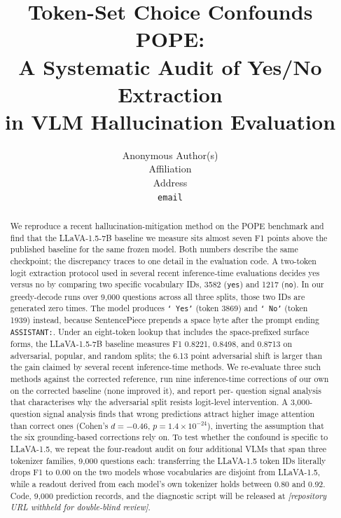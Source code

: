 \documentclass{article}
\title{Token-Set Choice Confounds POPE:\\
A Systematic Audit of Yes/No Extraction\\
in VLM Hallucination Evaluation}
\author{%
  Anonymous Author(s) \\
  Affiliation \\
  Address \\
  \texttt{email}
}
\begin{document}
\maketitle

\begin{abstract}
We reproduce a recent hallucination-mitigation method on the POPE
benchmark and find that the LLaVA-1.5-7B baseline we measure sits
almost seven F1 points above the published baseline for the same
frozen model. Both numbers describe the same checkpoint; the
discrepancy traces to one detail in the evaluation code. A two-token
logit extraction protocol used in several recent inference-time
evaluations decides yes versus no by comparing two specific vocabulary
IDs, 3582 (\texttt{yes}) and 1217 (\texttt{no}). In our greedy-decode
runs over 9{,}000 questions across all three splits, those two IDs are
generated zero times. The model produces \texttt{`\,Yes'} (token 3869)
and \texttt{`\,No'} (token 1939) instead, because SentencePiece
prepends a space byte after the prompt ending \texttt{ASSISTANT:}.
Under an eight-token lookup that includes the space-prefixed surface
forms, the LLaVA-1.5-7B baseline measures F1 0.8221, 0.8498, and
0.8713 on adversarial, popular, and random splits; the 6.13 point
adversarial shift is larger than the gain claimed by several recent
inference-time methods. We re-evaluate three such methods against
the corrected reference, run nine inference-time corrections of our
own on the corrected baseline (none improved it), and report per-
question signal analysis that characterises why the adversarial split
resists logit-level intervention. A 3{,}000-question signal analysis
finds that wrong predictions attract higher image attention than correct
ones (Cohen's $d=-0.46$, $p=1.4\times10^{-24}$), inverting the assumption
that the six grounding-based corrections rely on. To test whether the confound is
specific to LLaVA-1.5, we repeat the four-readout audit on four
additional VLMs that span three tokenizer families, 9{,}000 questions
each: transferring the LLaVA-1.5 token IDs literally drops F1 to 0.00 on
the two models whose vocabularies are disjoint from LLaVA-1.5, while a
readout derived from each model's own tokenizer holds between 0.80 and
0.92. Code, 9{,}000 prediction records, and
the diagnostic script will be released at \emph{[repository URL withheld
for double-blind review]}.
\end{abstract}

\end{document}
